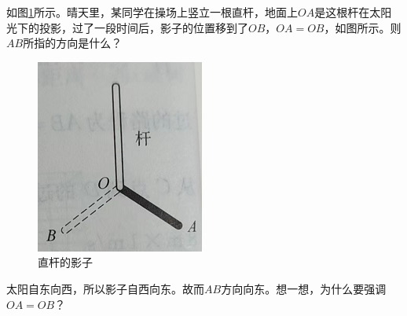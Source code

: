 \documentclass[windows,csize4, answers]{BHCexam}
\begin{document}
\begin{groups}
\begin{questions}[]
    \end{questions}

    \begin{questions}[]

        \question[5] 如图\ref{fig:fig_3_7}所示。晴天里，某同学在操场上竖立一根直杆，地面上$OA$是这根杆在太阳光下的投影，过了一段时间后，影子的位置移到了$OB$，$OA=OB$，如图所示。则$AB$所指的方向是什么？
        \begin{figure}[htb]
            \centering
            \includegraphics [scale=0.75,trim=0 0 0 0]{./image/fig_3_7.PNG}
            \caption{直杆的影子}
            \label{fig:fig_3_7}
        \end{figure}
        \begin{solution}{0.5cm}
            \methodonly 太阳自东向西，所以影子自西向东。故而$AB$方向向东。想一想，为什么要强调$OA=OB$？
        \end{solution}



    \end{questions}
















\end{groups}




\label{lastpage}
\end{document}
